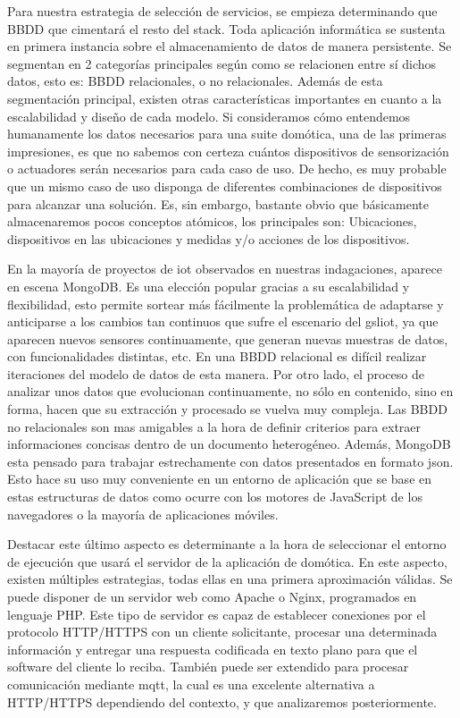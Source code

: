 Para nuestra estrategia de selección de servicios, se empieza determinando que BBDD que cimentará el resto del stack. Toda aplicación informática se sustenta en primera instancia sobre el almacenamiento de datos de manera persistente. Se segmentan en 2 categorías principales según como se relacionen entre sí dichos datos, esto es: BBDD relacionales, o no relacionales. Además de esta segmentación principal, existen otras características importantes en cuanto a la escalabilidad y diseño de cada modelo. Si consideramos cómo entendemos humanamente los datos necesarios para una suite domótica, una de las primeras impresiones, es que no sabemos con certeza cuántos dispositivos de sensorización o actuadores serán necesarios para cada caso de uso. De hecho, es muy probable que un mismo caso de uso disponga de diferentes combinaciones de dispositivos para alcanzar una solución. Es, sin embargo, bastante obvio que básicamente almacenaremos pocos conceptos atómicos, los principales son: Ubicaciones, dispositivos en las ubicaciones y medidas y/o acciones de los dispositivos.

\vspace{1cm}

En la mayoría de proyectos de \gls{iot} observados en nuestras indagaciones, aparece en escena MongoDB. Es una elección popular gracias a su escalabilidad y flexibilidad, esto permite sortear más fácilmente la problemática de adaptarse y anticiparse a los cambios tan continuos que sufre el escenario del gsl{iot}, ya que aparecen nuevos sensores continuamente, que generan nuevas muestras de datos, con funcionalidades distintas, etc. En una BBDD relacional es difícil realizar iteraciones del modelo de datos de esta manera. Por otro lado, el proceso de analizar unos datos que evolucionan continuamente, no sólo en contenido, sino en forma, hacen que su extracción y procesado se vuelva muy compleja. Las BBDD no relacionales son mas amigables a la hora de definir criterios para extraer informaciones concisas dentro de un documento heterogéneo. Además, MongoDB esta pensado para trabajar estrechamente con datos presentados en formato \gls{json}. Esto hace su uso muy conveniente en un entorno de aplicación que se base en estas estructuras de datos como ocurre con los motores de JavaScript de los navegadores o la mayoría de aplicaciones móviles.

\vspace{1cm}

Destacar este último aspecto es determinante a la hora de seleccionar el entorno de ejecución que usará el servidor de la aplicación de domótica. En este aspecto, existen múltiples estrategias, todas ellas en una primera aproximación válidas. Se puede disponer de un servidor web como Apache o Nginx, programados en lenguaje PHP. Este tipo de servidor es capaz de establecer conexiones por el protocolo HTTP/HTTPS con un cliente solicitante, procesar una determinada información y entregar una respuesta codificada en texto plano para que el software del cliente lo reciba. También puede ser extendido para procesar comunicación mediante \gls{mqtt}, la cual es una excelente alternativa a HTTP/HTTPS dependiendo del contexto, y que analizaremos posteriormente.

